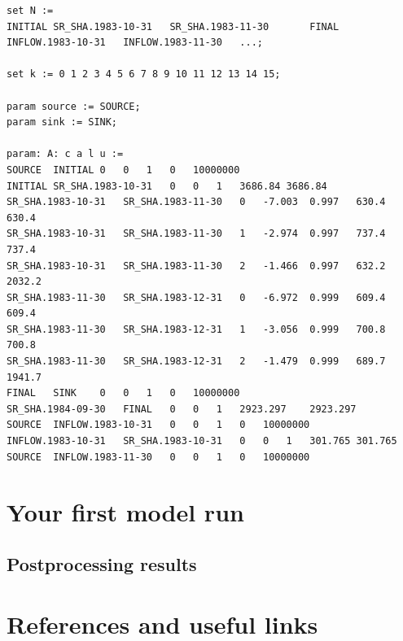 \documentclass[12pt]{article}%
\begin{document}
\begin{lstlisting}
set N :=
INITIAL	SR_SHA.1983-10-31	SR_SHA.1983-11-30		FINAL	
INFLOW.1983-10-31	INFLOW.1983-11-30	...;

set k := 0 1 2 3 4 5 6 7 8 9 10 11 12 13 14 15;

param source := SOURCE;
param sink := SINK;

param: A: c a l u :=
SOURCE	INITIAL	0	0	1	0	10000000
INITIAL	SR_SHA.1983-10-31	0	0	1	3686.84	3686.84
SR_SHA.1983-10-31	SR_SHA.1983-11-30	0	-7.003	0.997	630.4	630.4
SR_SHA.1983-10-31	SR_SHA.1983-11-30	1	-2.974	0.997	737.4	737.4
SR_SHA.1983-10-31	SR_SHA.1983-11-30	2	-1.466	0.997	632.2	2032.2
SR_SHA.1983-11-30	SR_SHA.1983-12-31	0	-6.972	0.999	609.4	609.4
SR_SHA.1983-11-30	SR_SHA.1983-12-31	1	-3.056	0.999	700.8	700.8
SR_SHA.1983-11-30	SR_SHA.1983-12-31	2	-1.479	0.999	689.7	1941.7
FINAL	SINK	0	0	1	0	10000000
SR_SHA.1984-09-30	FINAL	0	0	1	2923.297	2923.297
SOURCE	INFLOW.1983-10-31	0	0	1	0	10000000
INFLOW.1983-10-31	SR_SHA.1983-10-31	0	0	1	301.765	301.765
SOURCE	INFLOW.1983-11-30	0	0	1	0	10000000
\end{lstlisting}
%
\section{Your first model run}
%
\subsection{Postprocessing results}
%
\section{References and useful links}
\end{document}
